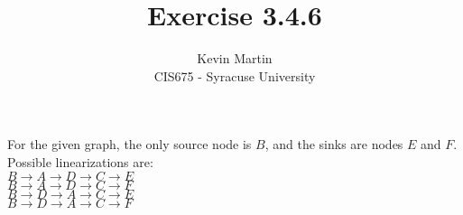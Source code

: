 \documentclass{article}
\author{Kevin Martin\\ CIS675 - Syracuse University}
\title{Exercise 3.4.6}
\begin{document}
\maketitle
For the given graph, the only source node is $B$, and the sinks are nodes $E$ and $F$.\\
Possible linearizations are:\\
$B\rightarrow A \rightarrow D \rightarrow C \rightarrow E$\\
$B\rightarrow A \rightarrow D \rightarrow C \rightarrow F$\\
$B\rightarrow D \rightarrow A \rightarrow C \rightarrow E$\\
$B\rightarrow D \rightarrow A \rightarrow C \rightarrow F$
\end{document}
